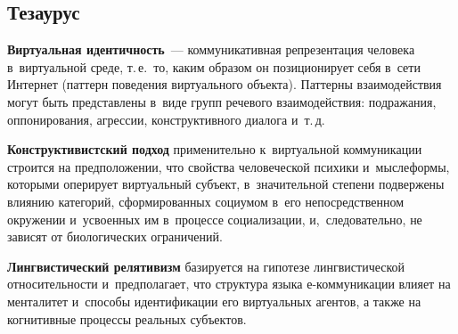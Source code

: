 \begin{multicols}{2}
\section{Тезаурус}

  \textbf{Виртуальная идентичность}~--- коммуникативная репрезентация 
человека в~виртуальной среде, т.\,е.\ то, каким образом он позиционирует себя 
в~сети Интернет (паттерн поведения виртуального объекта). Паттерны 
взаимодействия могут быть представлены в~виде групп речевого 
взаимодействия: подражания, оппонирования, агрессии, конструктивного 
диалога и~т.\,д.
  
  \textbf{Конструктивистский подход} применительно к~виртуальной 
коммуникации строится на предположении, что свойства человеческой психики 
и~мыс\-ле\-фор\-мы, которыми оперирует виртуальный субъект, в~значительной 
степени подвержены влиянию категорий, сформированных социумом в~его 
непосредственном окружении и~усвоенных им в~процессе социализации, 
и,~следовательно, не зависят от биологических ограничений.
  
  \textbf{Лингвистический релятивизм} базируется на гипотезе 
лингвистической относительности и~предполагает, что структура языка  
е-ком\-му\-ни\-ка\-ции влияет на менталитет и~способы идентификации его 
виртуальных агентов, а также на когнитивные процессы реальных субъектов.
  

\end{multicols}
